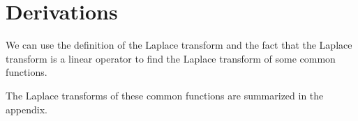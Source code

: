 \section{Derivations}
\noindent
We can use the definition of the Laplace transform and the fact that the Laplace transform is a linear operator to find the Laplace transform of some common functions.








\ifodd{}\fi

\noindent
The Laplace transforms of these common functions are summarized in the appendix.